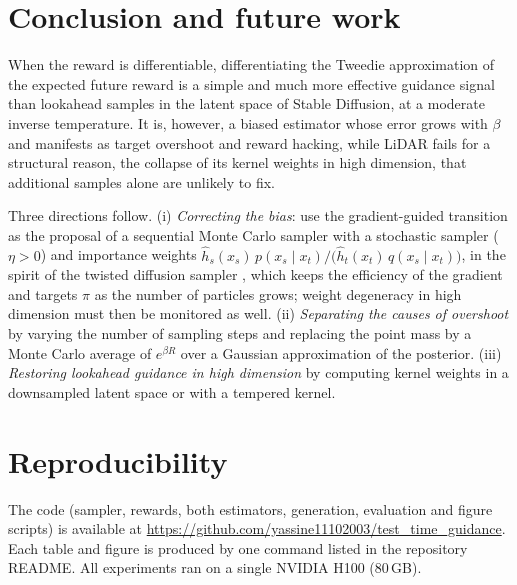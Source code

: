 \documentclass[11pt]{article}
\begin{document}
\section{Conclusion and future work}
\label{sec:conclusion}
When the reward is differentiable, differentiating the Tweedie approximation of the expected future reward is a simple and much more effective guidance signal than lookahead samples in the latent space of Stable Diffusion, at a moderate inverse temperature. It is, however, a biased estimator whose error grows with $\beta$ and manifests as target overshoot and reward hacking, while LiDAR fails for a structural reason, the collapse of its kernel weights in high dimension, that additional samples alone are unlikely to fix.

Three directions follow. (i) \emph{Correcting the bias}: use the gradient-guided transition as the proposal of a sequential Monte Carlo sampler with a stochastic sampler ($\eta>0$) and importance weights $\hat h_s(x_s)\,p(x_s\mid x_t)/\big(\hat h_t(x_t)\,q(x_s\mid x_t)\big)$, in the spirit of the twisted diffusion sampler \citep{wu2023tds}, which keeps the efficiency of the gradient and targets $\pi$ as the number of particles grows; weight degeneracy in high dimension must then be monitored as well. (ii) \emph{Separating the causes of overshoot} by varying the number of sampling steps and replacing the point mass by a Monte Carlo average of $e^{\beta R}$ over a Gaussian approximation of the posterior. (iii) \emph{Restoring lookahead guidance in high dimension} by computing kernel weights in a downsampled latent space or with a tempered kernel.

\section*{Reproducibility}
The code (sampler, rewards, both estimators, generation, evaluation and figure scripts) is available at \url{https://github.com/yassine11102003/test_time_guidance}. Each table and figure is produced by one command listed in the repository README. All experiments ran on a single NVIDIA H100 (80\,GB).



\end{document}
